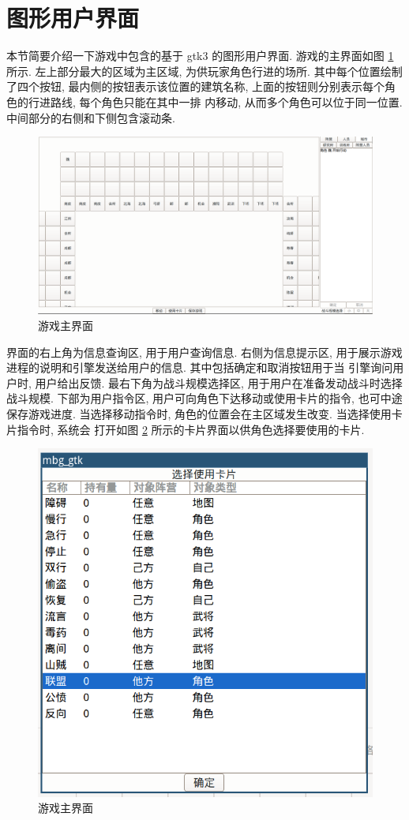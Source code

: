 \documentclass[UTF8, zihao=-4]{ctexart} %
\begin{document}
\section{图形用户界面}
\label{s_gui}
本节简要介绍一下游戏中包含的基于 gtk3 的图形用户界面.
游戏的主界面如图 \ref{f_main} 所示. 左上部分最大的区域为主区域, 为供玩家角色行进的场所.
其中每个位置绘制了四个按钮, 最内侧的按钮表示该位置的建筑名称, 
上面的按钮则分别表示每个角色的行进路线, 每个角色只能在其中一排
内移动, 从而多个角色可以位于同一位置. 中间部分的右侧和下侧包含滚动条.
\begin{figure}
    \centering
    \includegraphics[width=\textwidth]{f_main.png}
    \caption{\label{f_main}游戏主界面}
\end{figure}
界面的右上角为信息查询区, 用于用户查询信息. 
右侧为信息提示区, 用于展示游戏进程的说明和引擎发送给用户的信息. 其中包括确定和取消按钮用于当
引擎询问用户时, 用户给出反馈. 最右下角为战斗规模选择区, 用于用户在准备发动战斗时选择战斗规模.
下部为用户指令区, 用户可向角色下达移动或使用卡片的指令, 也可中途保存游戏进度. 
当选择移动指令时, 角色的位置会在主区域发生改变. 当选择使用卡片指令时, 系统会
打开如图 \ref{f_cards} 所示的卡片界面以供角色选择要使用的卡片.
\begin{figure}
    \centering
    \includegraphics[width=\textwidth]{f_cards.png}
    \caption{\label{f_cards}游戏主界面}
\end{figure}
\end{document}
